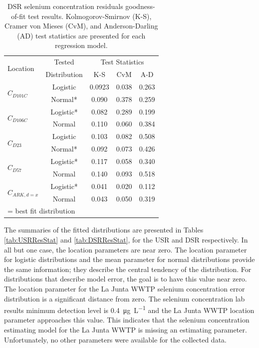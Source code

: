 \begin{table}[htbp]
  \centering
  \caption[DSR selenium concentration residuals goodness-of-fit test results.]{DSR selenium concentration residuals goodness-of-fit test results.  Kolmogorov-Smirnov (K-S), Cramer von Mieses (CvM), and Anderson-Darling (AD) test statistics are presented for each regression model.}
    \begin{tabular}{lcccc}
    \toprule
    \multirow{2}{*}{Location}&Tested & \multicolumn{3}{c}{Test Statistics} \\ \cmidrule(r{.5em}l){3-5}
    &Distribution  & K-S   & CvM   & A-D \\
    \toprule
    \multirow{2}{*}{$ C_{D101C} $}			&Logistic	&0.0923	&0.038	&0.263	\\
    								&Normal*	&0.090	&0.378	&0.259	\\
    \midrule
    \multirow{2}{*}{$ C_{D106C} $}			&Logistic*	&0.082	&0.289	&0.199	\\
    								&Normal		&0.110	&0.060	&0.384	\\
    \midrule
    \multirow{2}{*}{$ C_{D23} $}		&Logistic	&0.103	&0.082	&0.508	\\
    								&Normal*	&0.092	&0.073	&0.426	\\
    \midrule
    \multirow{2}{*}{$ C_{D57} $}		&Logistic*	&0.117	&0.058	&0.340	\\
    								&Normal		&0.140	&0.093	&0.518	\\
	\midrule
    \multirow{2}{*}{$ C_{ARK,d=x} $}		&Logistic*	&0.041	&0.020	&0.112	\\
    								&Normal		&0.043	&0.050	&0.319	\\
    \bottomrule
    \multicolumn{5}{l}{\footnotesize * = best fit distribution}\\
    \end{tabular}%
  \label{tab:DSRGof}%
\end{table}%

The summaries of the fitted distributions are presented in Tables \ref{tab:USRResStat} and \ref{tab:DSRResStat}, for the USR and DSR respectively.  In all but one case, the location parameters are near zero.  The location parameter for logistic distributions and the mean parameter for normal distributions provide the same information; they describe the central tendency of the distribution.  For distributions that describe model error, the goal is to have this value near zero.  The location parameter for the La Junta WWTP selenium concentration error distribution is a significant distance from zero.  The selenium concentration lab results minimum detection level is \SI{0.4}{\micro\gram\per\liter} and the La Junta WWTP location parameter approaches this value.  This indicates that the selenium concentration estimating model for the La Junta WWTP is missing an estimating parameter.  Unfortunately, no other parameters were available for the collected data.

